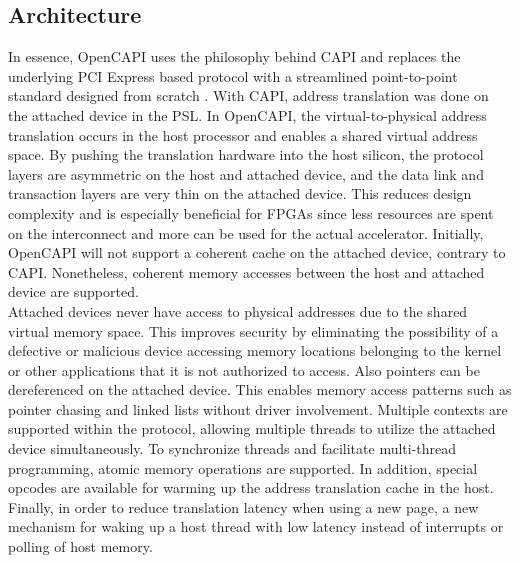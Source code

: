 \subsection{Architecture}
In essence, OpenCAPI uses the philosophy behind CAPI and replaces the underlying PCI Express based protocol with a streamlined point-to-point standard designed from scratch \cite{opencapi-enablement, benton, opencapi-jeff-preso}. With CAPI, address translation was done on the attached device in the PSL. In OpenCAPI, the virtual-to-physical address translation occurs in the host processor and enables a shared virtual address space. By pushing the translation hardware into the host silicon, the protocol layers are asymmetric on the host and attached device, and the data link and transaction layers are very thin on the attached device. This reduces design complexity and is especially beneficial for FPGAs since less resources are spent on the interconnect and more can be used for the actual accelerator. Initially, OpenCAPI will not support a coherent cache on the attached device, contrary to CAPI. Nonetheless, coherent memory accesses between the host and attached device are supported.\\
Attached devices never have access to physical addresses due to the shared virtual memory space. This improves security by eliminating the possibility of a defective or malicious device accessing memory locations belonging to the kernel or other applications that it is not authorized to access. Also pointers can be dereferenced on the attached device. This enables memory access patterns such as pointer chasing and linked lists without driver involvement. Multiple contexts are supported within the protocol, allowing multiple threads to utilize the attached device simultaneously. To synchronize threads and facilitate multi-thread programming, atomic memory operations are supported. In addition, special opcodes are available for warming up the address translation cache in the host. Finally, in order to reduce translation latency when using a new page, a new mechanism for waking up a host thread with low latency instead of interrupts or polling of host memory.



